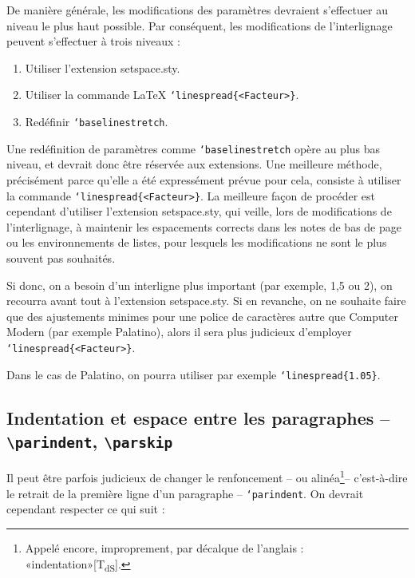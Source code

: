 \documentclass[fontsize=11pt, paper=a4, pagesize, captions=tableheading, numbers=enddot, toc=graduated, footnotes=multiple]{scrartcl}%
\DeclareRobustCommand*{\Macro}[1]{\mbox{\texttt{\char`\\#1}}}
\DeclareRobustCommand*{\LMacro}[2]{\mbox{\texttt{\char`\\#1\{#2\}}}}
\newcommand{\Paket}[1]{\textsf{#1.sty}\xspace}
\newcommand{\TB}{\textbackslash}
\newcommand{\NDT}{[T\textsubscript{dS}].} %
\begin{document}
\label{sec:ander-des-zeil}
De manière générale, les modifications des paramètres devraient s’effectuer au niveau le plus haut possible. Par conséquent, les modifications de l’interlignage peuvent s’effectuer à trois niveaux :
\begin{enumerate}
\item Utiliser l’extension \Paket{setspace}.
\item Utiliser la commande \LaTeX{} \LMacro{linespread}{<Facteur>}.
\item Redéfinir \Macro{baselinestretch}.
\end{enumerate}
Une redéfinition de paramètres comme \Macro{baselinestretch} opère au plus bas niveau, et devrait donc être réservée aux extensions. Une meilleure méthode, précisément parce qu’elle a été expressément prévue pour cela, consiste à utiliser la commande \LMacro{linespread}{<Facteur>}. La meilleure façon de procéder est cependant d’utiliser l’extension \Paket{setspace}, qui veille, lors de modifications de l’interlignage, à maintenir les espacements corrects dans les notes de bas de page ou les environnements de listes, pour lesquels les modifications ne sont le plus souvent pas souhaités.

Si donc, on a besoin d’un interligne plus important (par exemple, 1,5 ou 2), on recourra avant tout à l’extension \Paket{setspace}. Si en revanche, on ne souhaite faire que des ajustements minimes pour une police de caractères autre que Computer Modern (par exemple Palatino), alors il sera plus judicieux d’employer \LMacro{linespread}{<Facteur>}.

Dans le cas de Palatino, on pourra utiliser par exemple \LMacro{linespread}{1.05}.

\subsection{Indentation et espace entre les paragraphes
  – \texttt{\TB parindent}, \texttt{\TB parskip}}
\label{sec:absatz-und-abst}

Il peut être parfois judicieux de changer le renfoncement – ou alinéa\footnote{Appelé encore, improprement, par décalque de l'anglais : «indentation»\NDT}– c'est-à-dire le retrait de la première ligne d'un paragraphe – \Macro{parindent}. On devrait cependant respecter ce qui suit :
\end{document}
